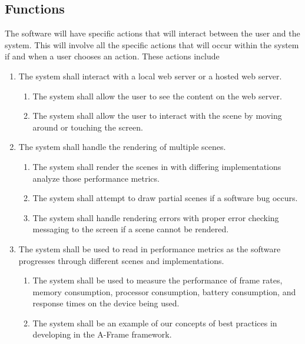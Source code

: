 \documentclass[letterpaper,10pt,titlepage,draftclsnofoot,onecolumn,compsoc,utf8,latin1]{IEEEtran}
\begin{document}
\begin{singlespace}
\begin{singlespace}
\end{singlespace}

\subsection{Functions}
\begin{singlespace}
\noindent
The software will have specific actions that will interact between the user and the system. This will involve all the specific actions that will occur within the system if and when a user chooses an action. These actions include \\
\end{singlespace}
\begin{enumerate}[labelsep=2em,leftmargin=.5in]
    \item The system shall interact with a local web server or a hosted web server. 
    \begin{enumerate}[leftmargin=*,labelindent=0pt]
        \item The system shall allow the user to see the content on the web server.
        \item The system shall allow the user to interact with the scene by moving around or touching the screen.
    \end{enumerate}
    \item The system shall handle the rendering of multiple scenes.
    \begin{enumerate}[leftmargin=*,labelindent=0pt]
        \item The system shall render the scenes in with differing implementations analyze those performance metrics.
        \item The system shall attempt to draw partial scenes if a software bug occurs.
        \item The system shall handle rendering errors with proper error checking messaging to the screen if a scene cannot be rendered.
    \end{enumerate}
    \item The system shall be used to read in performance metrics as the software progresses through different scenes and implementations.
    \begin{enumerate}[leftmargin=*,labelindent=0pt]
        \item The system shall be used to measure the performance of frame rates, memory consumption, processor consumption, battery consumption, and response times on the device being used.
        \item The system shall be an example of our concepts of best practices in developing in the A-Frame framework.
    \end{enumerate}
\end{enumerate}


\end{singlespace}
\end{document}
